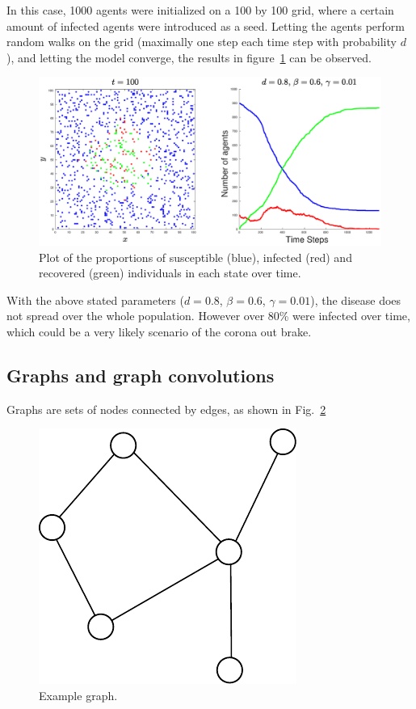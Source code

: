 \documentclass[%
 reprint,
 amsmath,amssymb,showkeys,
 aps,
]{revtex4-1}
\begin{document}
In this case, 1000 agents were initialized on a 100 by 100 grid, where a certain amount of infected agents were introduced as a seed. Letting the agents perform random walks on the grid (maximally one step each time step with probability $d$), and letting the model converge, the results in figure~\ref{fig:2} can be observed.

\begin{figure}[H]
	\centering
	\includegraphics[width=0.9\linewidth]{1_1000_agents}
	\caption{Plot of the proportions of susceptible (blue), infected (red) and recovered (green) individuals in each state over time.}%
	\label{fig:2}
\end{figure}

With the above stated parameters ($d=0.8$, $\beta=0.6$, $\gamma=0.01$), the disease does not spread over the whole population. However over 80\% were infected over time, which could be a very likely scenario of the corona out brake.

\subsection{Graphs and graph convolutions}

Graphs are sets of nodes connected by edges, as shown in Fig.~\ref{fig:graph_example}

\begin{figure}[H]
	\centering
	\includegraphics[width=0.8\columnwidth]{img/graph_example.pdf}
	\caption{Example graph.}
	\label{fig:graph_example}
\end{figure}
\end{document}
